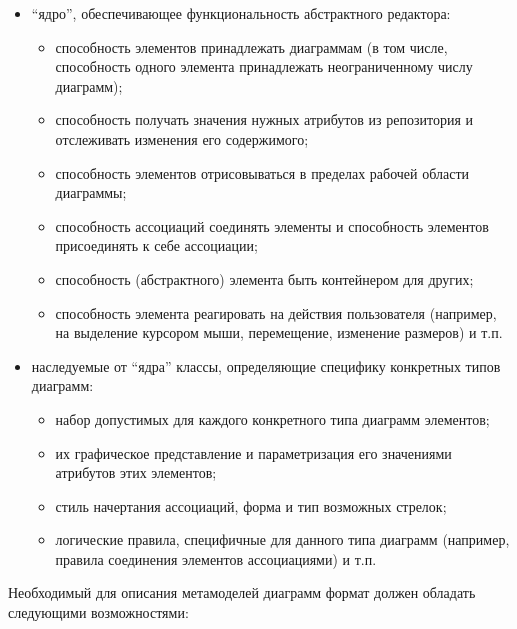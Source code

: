 \documentclass[a5paper]{article}
\begin{document}
\begin{itemize}
  \item ``ядро'', обеспечивающее функциональность абстрактного редактора:
    \begin{itemize}
      \item способность элементов принадлежать диаграммам (в том числе, способность
            одного элемента принадлежать неограниченному числу диаграмм);
          \item способность получать значения нужных атрибутов из репозитория и
            отслеживать изменения его содержимого;
          \item способность элементов отрисовываться в пределах рабочей области
            диаграммы;
          \item способность ассоциаций соединять элементы и способность элементов
            присоединять к себе ассоциации;
          \item способность (абстрактного) элемента быть контейнером для других;
          \item способность элемента реагировать на действия пользователя (например, на
            выделение курсором мыши, перемещение, изменение размеров) и т.п.
    \end{itemize}
  \item наследуемые от ``ядра'' классы, определяющие специфику конкретных типов
        диаграмм:
        \begin{itemize}
          \item набор допустимых для каждого конкретного типа диаграмм элементов;
          \item их графическое представление и параметризация его значениями атрибутов
                этих элементов;
          \item стиль начертания ассоциаций, форма и тип возможных стрелок;
          \item логические правила, специфичные для данного типа диаграмм (например,
                правила соединения элементов ассоциациями) и т.п.
        \end{itemize}
\end{itemize}

Необходимый для описания метамоделей диаграмм формат должен обладать
следующими возможностями:
\end{document}
